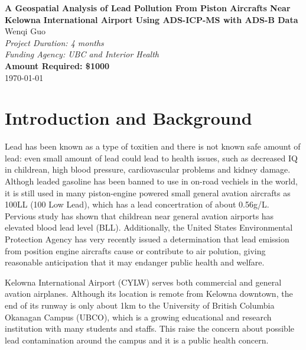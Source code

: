 \documentclass[12pt]{article}
\begin{document}
\begin{center}
    \Large{\textbf{A Geospatial Analysis of Lead Pollution From Piston Aircrafts Near Kelowna International Airport Using ADS-ICP-MS with ADS-B Data}}\\
    \vspace{1cm}
    \large{Wenqi Guo}\\
    \vspace{0.5cm}
    \textit{Project Duration: 4 months}\\
    \vspace{0.5cm}
    \textit{Funding Agency: UBC and Interior Health}\\
    \vspace{0.5cm}
    \textbf{Amount Required: \$1000}\\
    \vspace{1cm}
    \vspace{1cm}
    \today
\end{center}
\newpage

\section{Introduction and Background}
\indent Lead has been known as a type of toxitien and there is not known safe amount of lead: even small amount of lead could lead to health issues, such as decreased IQ in childrean, high blood pressure, cardiovascular problems and kidney damage. \cite{world_health_organization_lead_2023} Althogh leaded gasoline has been banned to use in on-road vechiels in the world, it is still used in many piston-engine powered small general avation aircrafts as 100LL (100 Low Lead), which has a lead concertration of about 0.56g/L. 
\cite{noauthor_safety_2021} Pervious study has shown that childrean near general avation airports has elevated blood lead level (BLL). \cite{miranda_geospatial_2011} \cite{zahran_leaded_2023} \cite{mills_lead_2022} \cite{zahran_effect_2017} Additionally, the United States Environmental Protection Agency has very recently issued a determination that lead emission from position engine aircrafts cause or contribute to air polution, giving reasonable anticipation that it may endanger public health and welfare.  \cite{us_epa_epa_2023} 

Kelowna International Airport (CYLW) serves both commercial and general avation airplanes. Although its location is remote from Kelowna downtown, the end of its runway is only about 1km to the University of British Columbia Okanagan Campus (UBCO), which is a growing educational and research institution with many students and staffs. This raise the concern about possible lead contamination around the campus and it is a public health concern.  
\end{document}
